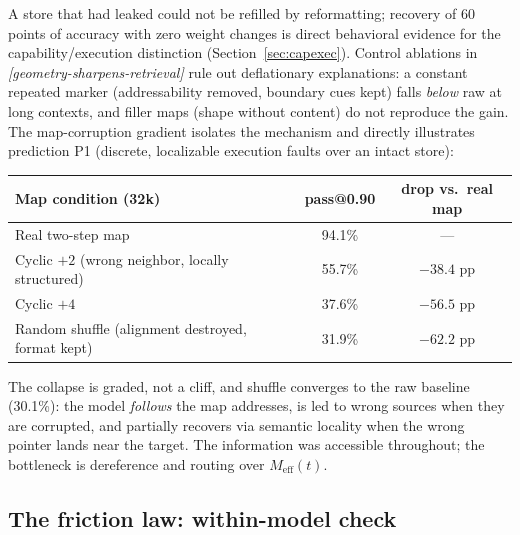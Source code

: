 \documentclass[11pt]{article}
\theoremstyle{remark}
\newif\ifslugs \slugstrue  %
\newcommand{\slug}[1]{\ifslugs\,{\small\textit{[#1]}}\fi}
\newcommand{\Meff}{M_{\mathrm{eff}}}
\begin{document}
A store that had leaked could not be refilled by reformatting; recovery of 60 points
of accuracy with zero weight changes is direct behavioral evidence for the
capability/execution distinction (Section~\ref{sec:capexec}). Control ablations in
\citet{franz2026lens}\slug{geometry-sharpens-retrieval} rule out deflationary explanations: a constant repeated marker
(addressability removed, boundary cues kept) falls \emph{below} raw at long contexts,
and filler maps (shape without content) do not reproduce the gain. The
map-corruption gradient isolates the mechanism and directly illustrates
prediction P1 (discrete, localizable execution faults over an intact store):

\begin{center}
\begin{tabular}{lcc}
\toprule
Map condition (32k) & pass@0.90 & drop vs.\ real map \\
\midrule
Real two-step map & 94.1\% & --- \\
Cyclic $+2$ (wrong neighbor, locally structured) & 55.7\% & $-38.4$ pp \\
Cyclic $+4$ & 37.6\% & $-56.5$ pp \\
Random shuffle (alignment destroyed, format kept) & 31.9\% & $-62.2$ pp \\
\bottomrule
\end{tabular}
\end{center}

The collapse is graded, not a cliff, and shuffle converges to the raw baseline
(30.1\%): the model \emph{follows} the map addresses, is led to wrong sources
when they are corrupted, and partially recovers via semantic locality when the
wrong pointer lands near the target. The information was accessible throughout;
the bottleneck is dereference and routing over $\Meff(t)$.

\subsection{The friction law: within-model check}
\end{document}
